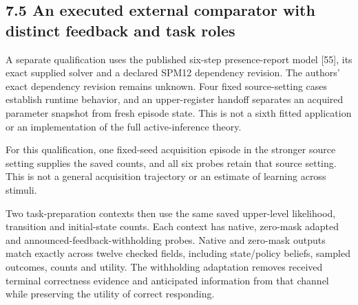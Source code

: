\documentclass[
  american,
  11pt,
  letterpaper,
]{article}
\begin{document}
\clearpage

\par\ifdim\dimexpr\pagegoal-\pagetotal\relax<180pt\newpage\fi
\subsection{7.5 An executed external comparator with distinct feedback and task roles}\label{an-executed-external-comparator-with-distinct-feedback-and-task-roles}

A separate qualification uses the published six-step presence-report model {[}55{]}, its exact supplied solver and a declared SPM12 dependency revision. The authors' exact dependency revision remains unknown. Four fixed source-setting cases establish runtime behavior, and an upper-register handoff separates an acquired parameter snapshot from fresh episode state. This is not a sixth fitted application or an implementation of the full active-inference theory.

For this qualification, one fixed-seed acquisition episode in the stronger source setting supplies the saved counts, and all six probes retain that source setting. This is not a general acquisition trajectory or an estimate of learning across stimuli.

Two task-preparation contexts then use the same saved upper-level likelihood, transition and initial-state counts. Each context has native, zero-mask adapted and announced-feedback-withholding probes. Native and zero-mask outputs match exactly across twelve checked fields, including state/policy beliefs, sampled outcomes, counts and utility. The withholding adaptation removes received terminal correctness evidence and anticipated information from that channel while preserving the utility of correct responding.
\end{document}
